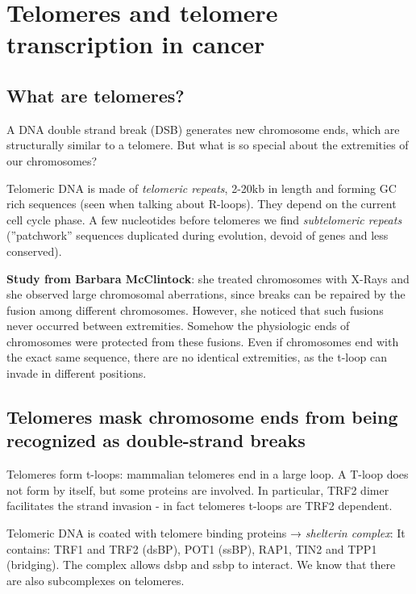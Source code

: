 \graphicspath{{chapters/_resources/}}

\chapter{Telomeres and telomere transcription in cancer}

\hypertarget{what-are-telomeres}{%
\section{What are telomeres?}\label{what-are-telomeres}}

A DNA double strand break (DSB) generates new chromosome ends, which are
structurally similar to a telomere. But what is so special about the
extremities of our chromosomes?

Telomeric DNA is made of \emph{telomeric repeats}, 2-20kb in length and
forming GC rich sequences (seen when talking about R-loops). They depend
on the current cell cycle phase. A few nucleotides before telomeres we
find \emph{subtelomeric repeats} (''patchwork'' sequences duplicated
during evolution, devoid of genes and less conserved).

\textbf{Study from Barbara McClintock}: she treated chromosomes with
X-Rays and she observed large chromosomal aberrations, since breaks can
be repaired by the fusion among different chromosomes. However, she
noticed that such fusions never occurred between extremities. Somehow
the physiologic ends of chromosomes were protected from these fusions.
Even if chromosomes end with the exact same sequence, there are no
identical extremities, as the t-loop can invade in different positions.

\hypertarget{telomeres-mask-chromosome-ends-from-being-recognized-as-double-strand-breaks}{%
\section{Telomeres mask chromosome ends from being recognized as double-strand breaks}\label{telomeres-mask-chromosome-ends-from-being-recognized-as-double-strand-breaks}}

Telomeres form t-loops: mammalian telomeres end in a large loop. A
T-loop does not form by itself, but some proteins are involved. In
particular, TRF2 dimer facilitates the strand invasion - in fact
telomeres t-loops are TRF2 dependent.

Telomeric DNA is coated with telomere binding proteins → \emph{shelterin
complex}: It contains: TRF1 and TRF2 (dsBP), POT1 (ssBP), RAP1, TIN2 and
TPP1 (bridging). The complex allows dsbp and ssbp to interact. We know
that there are also subcomplexes on telomeres.

